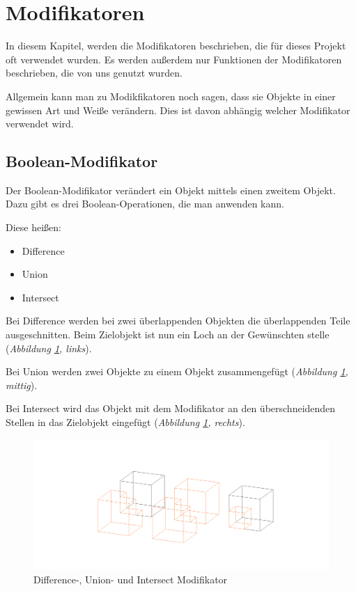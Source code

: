 \section{Modifikatoren}
In diesem Kapitel, werden die Modifikatoren beschrieben, die für dieses Projekt oft verwendet wurden.
Es werden außerdem nur Funktionen der Modifikatoren beschrieben, die von uns genutzt wurden.

Allgemein kann man zu Modikfikatoren noch sagen, dass sie Objekte in einer gewissen Art und Weiße verändern.
Dies ist davon abhängig welcher Modifikator verwendet wird.

\subsection{Boolean-Modifikator}\citep{blender:boolean_modifier}
\label{Boolean:heading}
Der Boolean-Modifikator verändert ein Objekt mittels einen zweitem Objekt. Dazu gibt es
drei Boolean-Operationen, die man anwenden kann.

Diese heißen:
\begin{itemize}
    \item  Difference
    \item  Union
    \item  Intersect
\end{itemize}

Bei Difference werden bei zwei überlappenden Objekten die überlappenden Teile ausgeschnitten. Beim Zielobjekt ist nun ein Loch an der Gewünschten stelle (\textit{Abbildung \ref{modifikatoren:image1}, links}).

Bei Union werden zwei Objekte zu einem Objekt zusammengefügt (\textit{Abbildung \ref{modifikatoren:image1}, mittig}).

Bei Intersect wird das Objekt mit dem Modifikator an den überschneidenden Stellen in das Zielobjekt eingefügt (\textit{Abbildung \ref{modifikatoren:image1}, rechts}).

\begin{figure}[h]
    \centering
    \includegraphics[width=.8\textwidth]{images/Modifikatoren-Boolean.png}
    \caption{Difference-, Union- und Intersect Modifikator}
    \label{modifikatoren:image1}
\end{figure}

